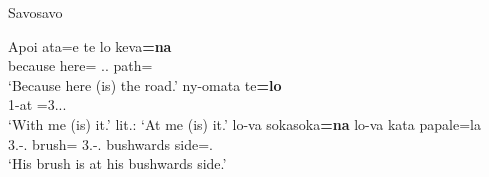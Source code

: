 \begin{exe}
\ex\label{SavLoc} {Savosavo} \citep[92, 208, 209]{Wegener:2008}\nopagebreak[4]
\begin{xlist}
\ex\gll Apoi ata=e te lo keva\textbf{=na}\\
because here=\emphat{} \emphat{} \deter.\sg.\mas{} path=\nom{}\\
\glt `Because here (is) the road.'
\ex\gll ny-omata te\textbf{=lo}\\
1\sg{}-at \partic{}=3.\sg{}.\mas{}.\nom{}\\
\glt `With me (is) it.' lit.: `At me (is) it.'
\ex\gll lo-va sokasoka\textbf{=na} lo-va kata papale=la\\
3\sg{}.\mas-\gen.\mas{} brush=\nom{} 3\sg{}.\mas-\gen.\mas{} bushwards side=\loc.\mas{}\\
\glt `His brush is at his bushwards side.'
\end{xlist}
\end{exe}

%

